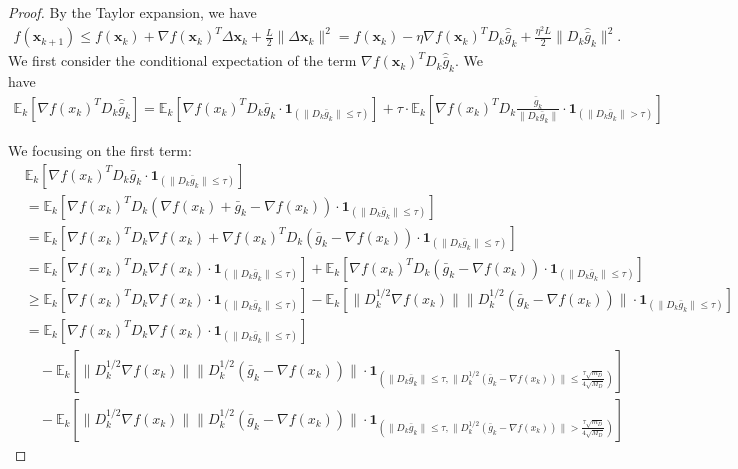 \documentclass{article}
\newcommand{\bx}{\boldsymbol{x}}
\newcommand{\barg}{\bar{g}}
\theoremstyle{plain}
\theoremstyle{definition}
\theoremstyle{remark}
\begin{document}
\begin{proof}

By the Taylor expansion, we have
    \begin{align*}
    f(\bx_{k+1})  \le f(\bx_k) + \nabla f(\bx_k)^T \Delta \bx_k + \frac{L }{2} \|\Delta \bx_k\|^2  = f(\bx_k) - \eta  \nabla f(\bx_k)^T D_k\widehat{\barg}_k + \frac{\eta^2 L }{2} \|D_k\widehat{\barg}_k\|^2.
\end{align*}
We first consider the conditional expectation of the 
term $\nabla f(\bx_k)^T D_k\widehat{\barg}_k$. We have
\begin{align*}
\mathbb{E}_k[\nabla f(x_k)^T D_k \widehat{\barg}_k ] = \mathbb{E}_k[\nabla f(x_k)^T D_k \bar{g}_k \cdot \boldsymbol{1}_{(\|D_k\bar{g}_k\| \le \tau)}]  + \tau \cdot \mathbb{E}_k\left[\nabla f(x_k)^T D_k \frac{\bar{g}_k}{\|D_k\bar{g}_k\|} \cdot \boldsymbol{1}_{(\|D_k\bar{g}_k\| > \tau)} \right]
\end{align*}

We focusing on the first term:
\begin{align*}
& \mathbb{E}_k[\nabla f(x_k)^T D_k \bar{g}_k \cdot \boldsymbol{1}_{(\|D_k\bar{g}_k\| \le \tau)}] \\
&= \mathbb{E}_k[\nabla f(x_k)^T D_k (\nabla f(x_k) + \bar{g}_k - \nabla f(x_k)) \cdot \boldsymbol{1}_{(\|D_k\bar{g}_k\| \le \tau)} ] \\
&= \mathbb{E}_k[\nabla f(x_k)^T D_k \nabla f(x_k) + \nabla f(x_k)^T D_k (\bar{g}_k - \nabla f(x_k)) \cdot \boldsymbol{1}_{(\|D_k\bar{g}_k\| \le \tau)} ]\\
& = \mathbb{E}_k[\nabla f(x_k)^T D_k \nabla f(x_k)\cdot \boldsymbol{1}_{(\|D_k\bar{g}_k\| \le \tau)}] + \mathbb{E}_k[\nabla f(x_k)^T D_k (\bar{g}_k - \nabla f(x_k)) \cdot \boldsymbol{1}_{(\|D_k\bar{g}_k\| \le \tau)}]\\
& \geq \mathbb{E}_k[\nabla f(x_k)^T D_k \nabla f(x_k)\cdot \boldsymbol{1}_{(\|D_k\bar{g}_k\| \le \tau)}] - \mathbb{E}_k[\|D_k^{1/2}\nabla f(x_k)\| \|D_k^{1/2} (\bar{g}_k - \nabla f(x_k))\| \cdot \boldsymbol{1}_{(\|D_k\bar{g}_k\| \le \tau)} ]\\
& = \mathbb{E}_k[\nabla f(x_k)^T D_k \nabla f(x_k)\cdot \boldsymbol{1}_{(\|D_k\bar{g}_k\| \le \tau) } ] \\
& \quad - \mathbb{E}_k[\|D_k^{1/2}\nabla f(x_k)\| \|D_k^{1/2} (\bar{g}_k - \nabla f(x_k))\| \cdot \boldsymbol{1}_{(\|D_k\bar{g}_k\| \le \tau,\|D_k^{1/2}(\bar{g}_k - \nabla f(x_k))\|\leq \frac{\tau\sqrt{m_D}}{4\sqrt{M_D}})}]\\
& \quad - \mathbb{E}_k[\|D_k^{1/2}\nabla f(x_k)\| \|D_k^{1/2} (\bar{g}_k - \nabla f(x_k))\| \cdot \boldsymbol{1}_{(\|D_k\bar{g}_k\| \le \tau,\|D_k^{1/2}(\bar{g}_k - \nabla f(x_k))\|> \frac{\tau\sqrt{m_D}}{4\sqrt{M_D}})}]
\end{align*}


\end{proof}
\end{document}
